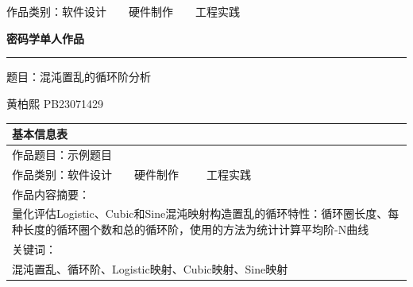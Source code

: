 \documentclass[a4paper]{article}
\newcommand{\cmark}{\ding{51}}%
\newcommand{\done}{\rlap{$\square$}{\raisebox{2pt}{\large\hspace{1pt}\cmark}}\hspace{-2.5pt}}
\begin{document}
\thispagestyle{empty}
\noindent\parbox[c]{.6\linewidth}{
	\linespread{1.3}
	\itshape  \par
    \  \par
    \  \par
    作品类别：\done 软件设计\ \ {\rlap{$\square$}{\large\hspace{1pt}}}\ \ 硬件制作\ \ {\rlap{$\square$}{\large\hspace{1pt}}}\ \ 工程实践 \par
}%



\begin{center}

\par\vspace{.2\textheight}

{\Large\textbf{密码学单人作品}\par}
\Large
\rule{\textwidth}{0.5mm}
\par\vspace{.05\textheight}
\Large{题目：混沌置乱的循环阶分析}

\medbreak
\par\vspace{.25\textheight}
\medbreak
黄柏熙 \quad PB23071429
\medbreak



\end{center}
\vfill
\begin{center}
        \begin{tabular}{ | p{.95\hsize} | }
    \hline
    基本信息表 \\
    \hline
    作品题目：示例题目\\
    \hline
    作品类别：\done 软件设计\ \ {\rlap{$\square$}{\large\hspace{1pt}}}\ \ 硬件制作\ \ \ {\rlap{$\square$}{\large\hspace{1pt}}}\ \ 工程实践 \\
    \hline
    作品内容摘要：\\
    \par 量化评估Logistic、Cubic和Sine混沌映射构造置乱的循环特性：循环圈长度、每种长度的循环圈个数和总的循环阶，使用的方法为统计计算平均阶-N曲线\\
    \hline
关键词：\\
混沌置乱、循环阶、Logistic映射、Cubic映射、Sine映射
\\
\hline
\end{tabular}
\end{center}
\end{document}
